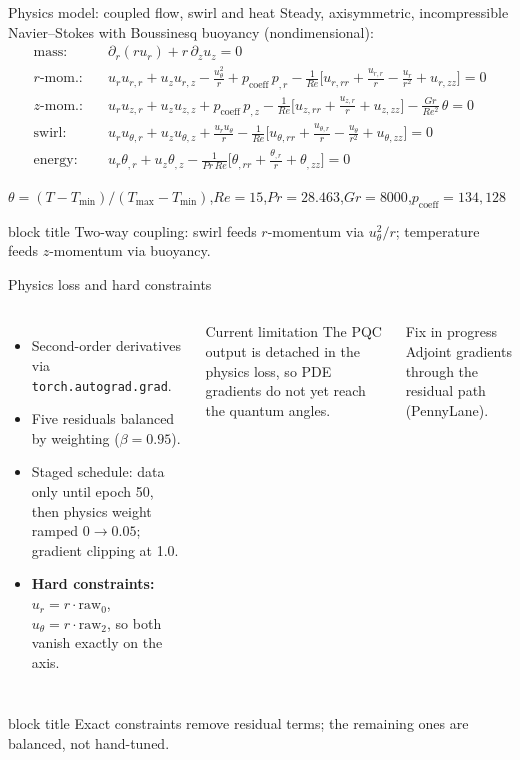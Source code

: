 \documentclass[aspectratio=169,10pt]{beamer}
\newcommand{\takeaway}[1]{%
  \vfill
  \begin{beamercolorbox}[rounded=true,shadow=false,wd=\linewidth,sep=4pt]{block title}
  \small\centering #1
  \end{beamercolorbox}}
\begin{document}
\begin{frame}{Physics model: coupled flow, swirl and heat}
\small Steady, axisymmetric, incompressible Navier--Stokes with Boussinesq buoyancy (nondimensional):
\begin{align*}
\text{mass:}\quad & \partial_r(r u_r) + r\,\partial_z u_z = 0\\[1pt]
\text{$r$-mom.:}\quad & u_r u_{r,r} + u_z u_{r,z} - \tfrac{u_\theta^2}{r} + p_{\mathrm{coeff}}\,p_{,r} - \tfrac{1}{Re}\big[u_{r,rr} + \tfrac{u_{r,r}}{r} - \tfrac{u_r}{r^2} + u_{r,zz}\big] = 0\\[1pt]
\text{$z$-mom.:}\quad & u_r u_{z,r} + u_z u_{z,z} + p_{\mathrm{coeff}}\,p_{,z} - \tfrac{1}{Re}\big[u_{z,rr} + \tfrac{u_{z,r}}{r} + u_{z,zz}\big] - \tfrac{Gr}{Re^2}\,\theta = 0\\[1pt]
\text{swirl:}\quad & u_r u_{\theta,r} + u_z u_{\theta,z} + \tfrac{u_r u_\theta}{r} - \tfrac{1}{Re}\big[u_{\theta,rr} + \tfrac{u_{\theta,r}}{r} - \tfrac{u_\theta}{r^2} + u_{\theta,zz}\big] = 0\\[1pt]
\text{energy:}\quad & u_r \theta_{,r} + u_z \theta_{,z} - \tfrac{1}{Pr\,Re}\big[\theta_{,rr} + \tfrac{\theta_{,r}}{r} + \theta_{,zz}\big] = 0
\end{align*}
\begin{center}
\footnotesize $\theta = (T-T_{\min})/(T_{\max}-T_{\min})$,\quad $Re=15$,\quad $Pr=28.463$,\quad $Gr=8000$,\quad $p_{\mathrm{coeff}}=134{,}128$
\end{center}
\takeaway{Two-way coupling: swirl feeds $r$-momentum via $u_\theta^2/r$; temperature feeds $z$-momentum via buoyancy.}
\end{frame}

\begin{frame}{Physics loss and hard constraints}
\begin{columns}[T,onlytextwidth]
\begin{itemize}\small\setlength{\itemsep}{3pt}
  \item Second-order derivatives via \texttt{torch.autograd.grad}.
  \item Five residuals balanced by weighting ($\beta=0.95$).
  \item Staged schedule: data only until epoch 50, then physics weight ramped $0\to0.05$; gradient clipping at 1.0.
  \item \textbf{Hard constraints:} $u_r=r\cdot\mathrm{raw}_0$, $u_\theta=r\cdot\mathrm{raw}_2$, so both vanish exactly on the axis.
\end{itemize}
\begin{alertblock}{Current limitation}
\small The PQC output is detached in the physics loss, so PDE gradients do not yet reach the quantum angles.
\end{alertblock}
\begin{block}{Fix in progress}
\small Adjoint gradients through the residual path (PennyLane).
\end{block}
\end{columns}
\takeaway{Exact constraints remove residual terms; the remaining ones are balanced, not hand-tuned.}
\end{frame}
\end{document}
